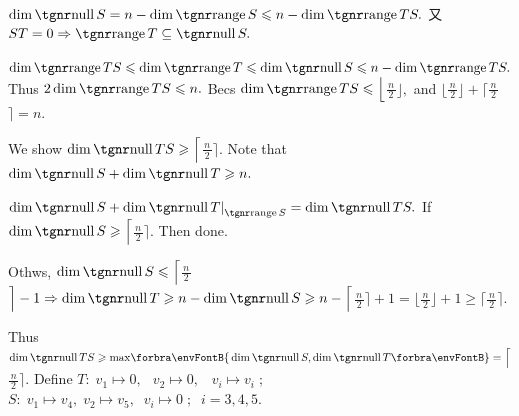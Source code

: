 \Or $\dim\null S=n-\dim\range S\leqslant n-\dim\range TS.$ \;又 $ST=0\Rightarrow\range T\subseteq\null S.$\par\quad
$\dim\range TS\leqslant\dim\range T\leqslant\dim\null S\leqslant n-\dim\range TS.$ \;Thus \;$2\dim\range TS\leqslant n.$\PfEnd\vspace{5pt}\quad
\Or Becs $\dim\range TS\leqslant\Big\lfloor${\Large$\frac{\,n\,}{2}$}$\Big\rfloor,$ and $\Big\lfloor${\Large$\frac{\,n\,}{2}$}$\Big\rfloor+\Big\lceil${\Large$\frac{\,n\,}{2}$}$\Big\rceil=n.$\par\vspace{1pt}\quad
We show $\dim\null TS\geqslant\Big\lceil${\Large$\frac{\,n\,}{2}$}$\Big\rceil.$ Note that $\dim\null S+\dim\null T\geqslant n.$\par\quad
$\dim\null S+\dim\null T\mmid_{\range S}=\dim\null TS.$ \;If $\dim\null S\geqslant\Big\lceil${\Large$\frac{\,n\,}{2}$}$\Big\rceil.$ Then done.\par\vspace{1pt}\quad
Othws, $\dim\null S\leqslant\Big\lceil${\Large$\frac{\,n\,}{2}$}$\Big\rceil-1\Rightarrow\dim\null T\geqslant n-\dim\null S\geqslant n-\Big\lceil${\Large$\frac{\,n\,}{2}$}$\Big\rceil+1=\Big\lfloor${\Large$\frac{\,n\,}{2}$}$\Big\rfloor+1\geqslant\Big\lceil${\Large$\frac{\,n\,}{2}$}$\Big\rceil.$\par\vspace{2pt}\quad
Thus $\dim\null TS\geqslant\max\!\Bra{\dim\null S,\dim\null T}=\Big\lceil${\Large$\frac{\,n\,}{2}$}$\Big\rceil.$\PfEnd\vspace{4pt}\quad
\AExa Define $T: \; v_1\mapsto 0, \;\;\, v_2\mapsto 0, \;\;\; v_i\mapsto v_i\;;$ \;\; $S: \; v_1\mapsto v_4, \; v_2\mapsto v_5, \;\; v_i\mapsto 0\;;\;\; i=3,4,5.$\par\vspace{-2pt}
\SepLine

